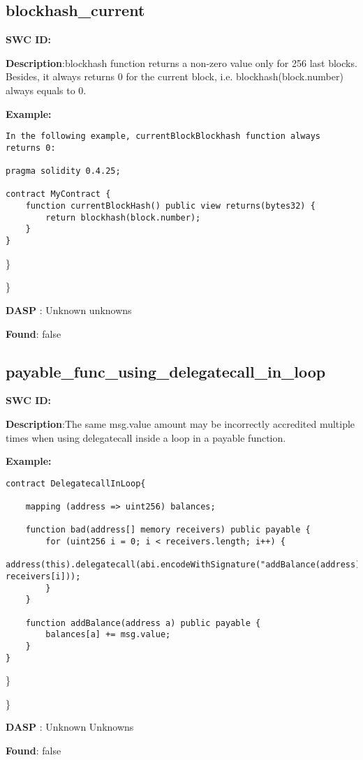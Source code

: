 \documentclass{article}
\begin{document}
\subsection{blockhash\_current} 
\textbf{SWC \textunderscore ID:} 

\textbf{Description}:blockhash function returns a non-zero value only for 256 last blocks. Besides, it always returns 0 for the current block, i.e. blockhash(block.number) always equals to 0.


\textbf{Example:} 
\begin{verbatim}
In the following example, currentBlockBlockhash function always returns 0:

pragma solidity 0.4.25;

contract MyContract {
    function currentBlockHash() public view returns(bytes32) {
        return blockhash(block.number);
    }
}

\end{verbatim}\} 

\} 

\textbf{DASP} : Unknown unknowns

\textbf{Found}: false

\subsection{payable\_func\_using\_delegatecall\_in\_loop} 
\textbf{SWC \textunderscore ID:} 

\textbf{Description}:The same msg.value amount may be incorrectly accredited multiple times when using delegatecall inside a loop in a payable function.


\textbf{Example:} 
\begin{verbatim}
contract DelegatecallInLoop{

    mapping (address => uint256) balances;

    function bad(address[] memory receivers) public payable {
        for (uint256 i = 0; i < receivers.length; i++) {
            address(this).delegatecall(abi.encodeWithSignature("addBalance(address)", receivers[i]));
        }
    }

    function addBalance(address a) public payable {
        balances[a] += msg.value;
    }
}

\end{verbatim}\} 

\} 

\textbf{DASP} : Unknown Unknowns

\textbf{Found}: false
\end{document}
